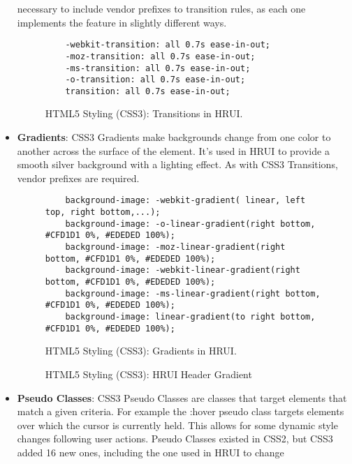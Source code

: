 \begin{itemize}
  necessary to include vendor prefixes to transition rules, as each one implements the feature in slightly different ways.
  \begin{figure}[h]
    \centering
    \begin{verbatim}
    -webkit-transition: all 0.7s ease-in-out;
    -moz-transition: all 0.7s ease-in-out;
    -ms-transition: all 0.7s ease-in-out;
    -o-transition: all 0.7s ease-in-out;
    transition: all 0.7s ease-in-out;
    \end{verbatim}
    \caption{HTML5 Styling (CSS3): Transitions in HRUI.}
  \end{figure}
  \item \textbf{Gradients}: CSS3 Gradients make backgrounds change from one color to another across the surface of the
  element. It's used in HRUI to provide a smooth silver background with a lighting effect. As with CSS3 Transitions, vendor
  prefixes are required.
  \begin{figure}[h]
    \centering
    \begin{verbatim}
    background-image: -webkit-gradient( linear, left top, right bottom,...);
    background-image: -o-linear-gradient(right bottom, #CFD1D1 0%, #EDEDED 100%);
    background-image: -moz-linear-gradient(right bottom, #CFD1D1 0%, #EDEDED 100%);
    background-image: -webkit-linear-gradient(right bottom, #CFD1D1 0%, #EDEDED 100%);
    background-image: -ms-linear-gradient(right bottom, #CFD1D1 0%, #EDEDED 100%);
    background-image: linear-gradient(to right bottom, #CFD1D1 0%, #EDEDED 100%);
    \end{verbatim}
    \caption{HTML5 Styling (CSS3): Gradients in HRUI.}
  \end{figure}
  \begin{figure}[h]
    \begin{center}
    \end{center}
    \caption{HTML5 Styling (CSS3): HRUI Header Gradient}
  \end{figure}
  \item \textbf{Pseudo Classes}: CSS3 Pseudo Classes are classes that target elements that match a given criteria. For example
  the :hover pseudo class targets elements over which the cursor is currently held. This allows for some dynamic style changes
  following user actions. Pseudo Classes existed in CSS2, but CSS3 added 16 new ones, including the one used in HRUI to change

\end{itemize}
